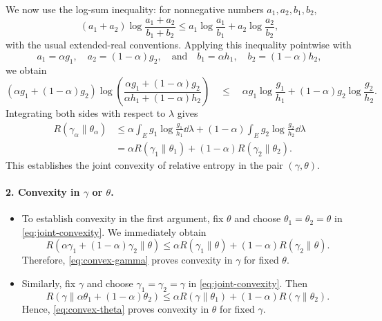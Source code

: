 \documentclass[12pt,a4paper,oneside]{book}
\begin{document}
\begin{solution}
We now use the log-sum inequality: for nonnegative numbers $a_1,a_2,b_1,b_2$,
\begin{equation*}
    (a_1+a_2)\log\frac{a_1+a_2}{b_1+b_2} \leq
    a_1\log\frac{a_1}{b_1} + a_2\log\frac{a_2}{b_2},
\end{equation*}
with the usual extended-real conventions. Applying this inequality pointwise with
\begin{equation*}
    a_1=\alpha g_1,\quad a_2=(1-\alpha)g_2,
    \quad \text{and} \quad
    b_1=\alpha h_1,\quad b_2=(1-\alpha)h_2,
\end{equation*}
we obtain
\begin{equation*}
    (\alpha g_1+(1-\alpha)g_2)
    \log\left(
        \frac{\alpha g_1+(1-\alpha)g_2}{\alpha h_1+(1-\alpha)h_2}
    \right)
    \quad\leq\quad
    \alpha g_1\log\frac{g_1}{h_1} + (1-\alpha)g_2\log\frac{g_2}{h_2}.
\end{equation*}
Integrating both sides with respect to $\lambda$ gives
\begin{equation*}
    \begin{aligned}
        R(\gamma_\alpha\|\theta_\alpha) &\leq
        \alpha\int_E g_1\log\frac{g_1}{h_1}\dd\lambda + (1-\alpha)\int_E g_2\log\frac{g_2}{h_2}\dd\lambda\\
        &=\alpha R(\gamma_1\|\theta_1) + (1-\alpha)R(\gamma_2\|\theta_2).
    \end{aligned}
\end{equation*}
This establishes the joint convexity of relative entropy in the pair $(\gamma,\theta)$.

\paragraph{2. Convexity in $\gamma$ or $\theta$.}
\begin{itemize}
    \item To establish convexity in the first argument, fix $\theta$ and choose $\theta_1=\theta_2=\theta$ in \eqref{eq:joint-convexity}.
        We immediately obtain
        \begin{equation}
            R(\alpha\gamma_1+(1-\alpha)\gamma_2\|\theta) \leq
            \alpha R(\gamma_1\|\theta) + (1-\alpha)R(\gamma_2\|\theta).
            \label{eq:convex-gamma}
        \end{equation}
        Therefore, \eqref{eq:convex-gamma} proves convexity in $\gamma$ for fixed $\theta$.

    \item Similarly, fix $\gamma$ and choose $\gamma_1=\gamma_2=\gamma$ in \eqref{eq:joint-convexity}. Then
        \begin{equation}
            R(\gamma\|\alpha\theta_1+(1-\alpha)\theta_2) \leq \alpha R(\gamma\|\theta_1)+(1-\alpha)R(\gamma\|\theta_2).
            \label{eq:convex-theta}
        \end{equation}
        Hence, \eqref{eq:convex-theta} proves convexity in $\theta$ for fixed $\gamma$.
\end{itemize}


\end{solution}
\end{document}
